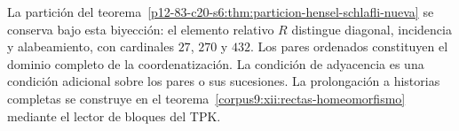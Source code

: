 La partición del teorema~\ref{p12-83-c20-s6:thm:particion-hensel-schlafli-nueva}
se conserva bajo esta biyección: el elemento relativo \(R\) distingue
diagonal, incidencia y alabeamiento, con cardinales \(27\), \(270\)
y \(432\). Los pares ordenados constituyen el dominio completo de
la coordenatización. La condición de adyacencia es una condición adicional sobre
los pares o sus sucesiones. La prolongación a historias completas se
construye en el teorema~\ref{corpus9:xii:rectas-homeomorfismo} mediante
el lector de bloques del TPK.
